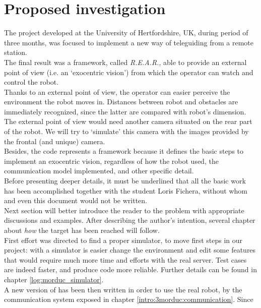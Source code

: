 \section{Proposed investigation}
\label{intro:proposed_investigation}

The project developed at the University of Hertfordshire,
UK, during period of three months, was focused to implement
a new way of teleguiding \morduc{} from a remote station.
\\
The final result was a framework, called \textit{R.E.A.R.},
able to provide an external point of view (i.e. an `exocentric
vision') from which the operator
can watch and control the robot.
\\
Thanks to an external point of view, the operator can easier
perceive the environment the robot moves in. Distances between
robot and obstacles are immediately recognized, since the latter
are compared with robot's dimension.
\\
The external point of view would need another camera situated
on the rear part of the robot. We will try to `simulate' this
camera with the images provided by the frontal (and unique)
camera.
\\
Besides, the code represents a framework because it defines the basic
steps to implement an exocentric vision, regardless of how the
robot used, the communication model implemented, and other
specific detail.
\\
Before presenting deeper details, it must be underlined that
all the basic work has been accomplished together with the
student Loris Fichera, without whom \framework{} and even
this document would not be written.
\\
Next section will better introduce the reader to the problem with
appropriate discussions and examples. After describing
the author's intention, several chapter about \textit{how} the
target has been reached will follow.
\\
First effort was directed to find a proper \morduc{} simulator,
to move first steps in our project: with a simulator is easier
change the environment and edit some features that would require
much more time and efforts with the real server. Test cases are
indeed faster, and produce code more reliable. Further details
can be found in chapter \ref{log:morduc_simulator}.
\\
A new version of \framework{} has been then written in order
to use the real \morduc{} robot, by the communication system exposed
in chapter \ref{intro:3morduc:communication}. Since \framework{}
